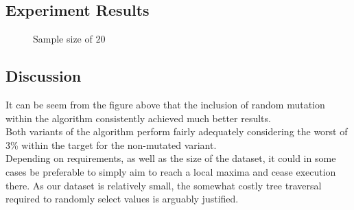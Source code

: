 \documentclass[a4paper]{article}
\begin{document}
  
\newpage
\subsection{Experiment Results}

\begin{figure}[h]
  
\centering
\caption{Sample size of $20$}
\label{fig:x Mutation Plot}

\end{figure}

\subsection{Discussion}

It can be seem from the figure above that the inclusion of random mutation within
the algorithm consistently achieved much better results. \\

Both variants of the algorithm perform fairly adequately considering the
worst of 3\% within the target for the non-mutated variant. \\

Depending on requirements, as well as the size of the dataset,
it could in some cases be preferable to simply aim 
to reach a local maxima and cease execution there. 
As our dataset is relatively small, the somewhat costly tree traversal required
to randomly select values is arguably justified. \\
\end{document}
